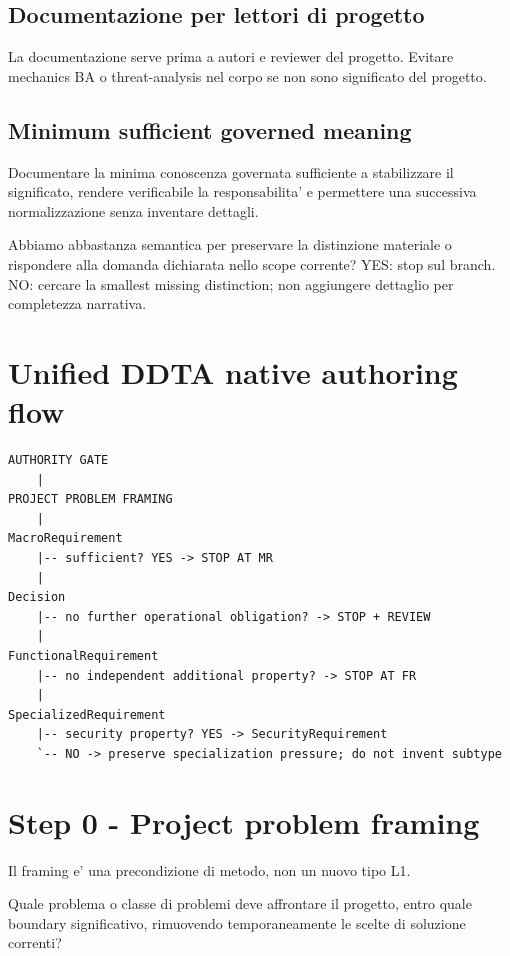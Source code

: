 \documentclass[11pt,a4paper]{article}
\begin{document}
\subsection{Documentazione per lettori di progetto}
\layertwotag
La documentazione serve prima a autori e reviewer del progetto. Evitare mechanics BA o threat-analysis nel corpo se non sono significato del progetto.

\subsection{Minimum sufficient governed meaning}
\closedtag
Documentare la minima conoscenza governata sufficiente a stabilizzare il significato, rendere verificabile la responsabilita' e permettere una successiva normalizzazione senza inventare dettagli.

\begin{ddtacheck}[title={Stopping criterion}]
Abbiamo abbastanza semantica per preservare la distinzione materiale o rispondere alla domanda dichiarata nello scope corrente? YES: stop sul branch. NO: cercare la smallest missing distinction; non aggiungere dettaglio per completezza narrativa.
\end{ddtacheck}

\section{Unified DDTA native authoring flow}

\begin{lstlisting}
AUTHORITY GATE
    |
PROJECT PROBLEM FRAMING
    |
MacroRequirement
    |-- sufficient? YES -> STOP AT MR
    |
Decision
    |-- no further operational obligation? -> STOP + REVIEW
    |
FunctionalRequirement
    |-- no independent additional property? -> STOP AT FR
    |
SpecializedRequirement
    |-- security property? YES -> SecurityRequirement
    `-- NO -> preserve specialization pressure; do not invent subtype
\end{lstlisting}

\section{Step 0 - Project problem framing}
\closedtag

Il framing e' una precondizione di metodo, non un nuovo tipo L1.

\begin{ddtacheck}[title={Domanda fondamentale}]
Quale problema o classe di problemi deve affrontare il progetto, entro quale boundary significativo, rimuovendo temporaneamente le scelte di soluzione correnti?
\end{ddtacheck}
\end{document}
